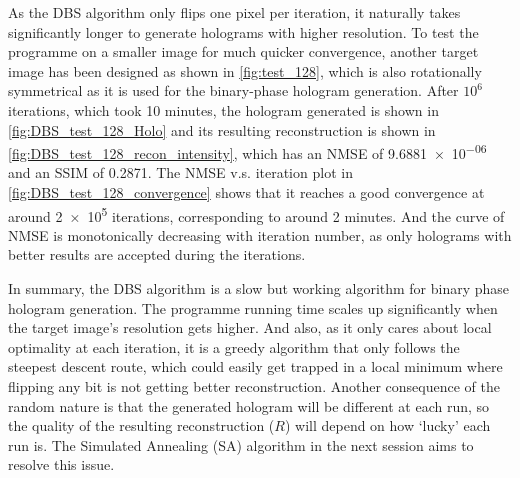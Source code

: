 As the DBS algorithm only flips one pixel per iteration, it naturally takes significantly longer to generate holograms with higher resolution. To test the programme on a smaller image for much quicker convergence, another target image has been designed as shown in \cref{fig:test_128}, which is also rotationally symmetrical as it is used for the binary-phase hologram generation. After $10^6$ iterations, which took 10 minutes, the hologram generated is shown in \cref{fig:DBS_test_128_Holo} and its resulting reconstruction is shown in \cref{fig:DBS_test_128_recon_intensity}, which has an NMSE of \num{9.6881e-06} and an SSIM of 0.2871. The NMSE v.s. iteration plot in \cref{fig:DBS_test_128_convergence} shows that it reaches a good convergence at around \num{2e5} iterations, corresponding to around 2 minutes. And the curve of NMSE is monotonically decreasing with iteration number, as only holograms with better results are accepted during the iterations.

In summary, the DBS algorithm is a slow but working algorithm for binary phase hologram generation. The programme running time scales up significantly when the target image's resolution gets higher. And also, as it only cares about local optimality at each iteration, it is a greedy algorithm that only follows the steepest descent route, which could easily get trapped in a local minimum where flipping any bit is not getting better reconstruction. Another consequence of the random nature is that the generated hologram will be different at each run, so the quality of the resulting reconstruction ($R$) will depend on how `lucky' each run is. The Simulated Annealing (SA) algorithm \cite{Kirkpatrick1983} in the next session aims to resolve this issue.


